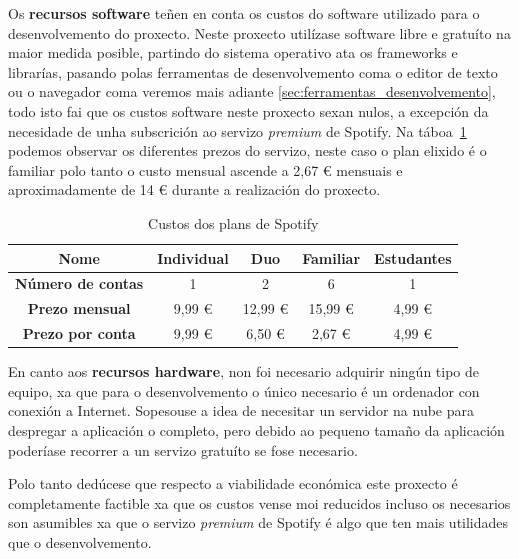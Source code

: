 Os \textbf{recursos software} teñen en conta os custos do software utilizado para o desenvolvemento do proxecto. Neste proxecto utilízase software libre e gratuíto na maior medida posible, partindo do sistema operativo ata os frameworks e librarías, pasando polas ferramentas de desenvolvemento coma o editor de texto ou o navegador coma veremos mais adiante \ref{sec:ferramentas_desenvolvemento}, todo isto fai que os custos software neste proxecto sexan nulos, a excepción da necesidade de unha subscrición ao servizo \textit{premium} de Spotify. Na táboa~\ref{tab:spotify_plans} podemos observar os diferentes prezos do servizo, neste caso o plan elixido é o familiar polo tanto o custo mensual ascende a 2,67 € mensuais e aproximadamente de 14 € durante a realización do proxecto.

\begin{table}[tbp]
	\caption{Custos dos plans de Spotify}
	\label{tab:spotify_plans}
	\centering
	\begin{tabular}{|c|c|c|c|c|}
		\hline
		{\textbf{Nome}}             & Individual & Duo    & Familiar & Estudantes \\ \hline
		{\textbf{Número de contas}} & 1          & 2      & 6        & 1          \\ \hline
		{\textbf{Prezo mensual}}    & 9,99 €     & 12,99 €& 15,99 €  & 4,99 €      \\ \hline
		{\textbf{Prezo por conta}}  & 9,99 €     & 6,50 € & 2,67 €   & 4,99 €      \\ \hline
	\end{tabular}
\end{table}

En canto aos \textbf{recursos hardware}, non foi necesario adquirir ningún tipo de equipo, xa que para o desenvolvemento o único necesario é un ordenador con conexión a Internet. Sopesouse a idea de necesitar un servidor na nube para despregar a aplicación o completo, pero debido ao pequeno tamaño da aplicación poderíase recorrer a un servizo gratuíto se fose necesario.

Polo tanto dedúcese que respecto a viabilidade económica este proxecto é completamente factible xa que os custos vense moi reducidos incluso os necesarios son asumibles xa que o servizo \textit{premium} de Spotify é algo que ten mais utilidades que o desenvolvemento.

